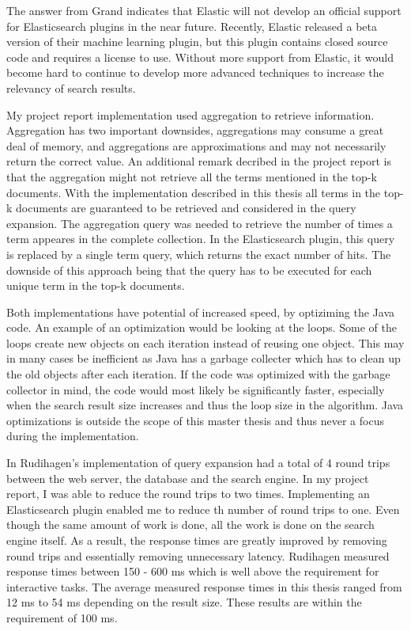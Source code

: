 The answer from Grand indicates that Elastic will not develop an official support for Elasticsearch plugins in the near future.
Recently, Elastic released a beta version of their machine learning plugin,
but this plugin contains closed source code and requires a license to use.
Without more support from Elastic,
it would become hard to continue to develop more advanced techniques to increase the relevancy of search results.

My project report \cite{project-report} implementation used aggregation to retrieve information.
Aggregation has two important downsides,
aggregations may consume a great deal of memory,
and aggregations are approximations and may not necessarily return the correct value.
An additional remark decribed in the project report is that the aggregation might not retrieve all the terms mentioned in the top-k documents.
With the implementation described in this thesis all terms in the top-k documents are guaranteed to be retrieved and considered in the query expansion.
The aggregation query was needed to retrieve the number of times a term appeares in the complete collection.
In the Elasticsearch plugin,
this query is replaced by a single term query,
which returns the exact number of hits.
The downside of this approach being that the query has to be executed for each unique term in the top-k documents.

Both implementations have potential of increased speed, by optiziming the Java code.
An example of an optimization would be looking at the loops.
Some of the loops create new objects on each iteration instead of reusing one object.
This may in many cases be inefficient as Java has a garbage collecter which has to clean up the old objects after each iteration.
If the code was optimized with the garbage collector in mind,
the code would most likely be significantly faster,
especially when the search result size increases and thus the loop size in the algorithm.
Java optimizations is outside the scope of this master thesis and thus never a focus during the implementation.

In Rudihagen's implementation of query expansion had a total of 4 round trips between the web server, the database and the search engine.
In my project report, I was able to reduce the round trips to two times.
Implementing an Elasticsearch plugin enabled me to reduce th number of round trips to one.
Even though the same amount of work is done, all the work is done on the search engine itself.
As a result,
the response times are greatly improved by removing round trips and essentially removing unnecessary latency.
Rudihagen measured response times between 150 - 600 ms which is well above the requirement for interactive tasks.
The average measured response times in this thesis ranged from 12 ms to 54 ms depending on the result size.
These results are within the requirement of 100 ms.



